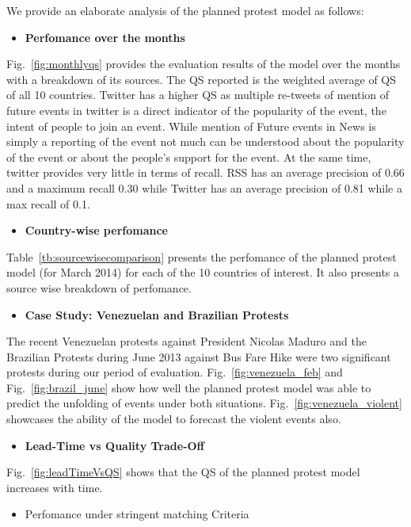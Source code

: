 We provide an elaborate analysis of the planned protest model as follows:
\begin{itemize}
    \item {\bf Perfomance over the months}
\end{itemize}
    Fig.~\ref{fig:monthlyqs} provides the evaluation results of the model over the months with a breakdown of its sources. The QS reported is the weighted average of QS of all 10 countries.
    Twitter has a higher QS as multiple re-tweets of mention of future events in twitter is a direct indicator of the popularity of the event, the intent of people to join an event. While mention of Future events in News is simply a reporting of the event not much can be understood about the popularity of the event or about the people's support for the event. At the same time, twitter provides very little in terms of recall.
RSS has an average precision of 0.66 and a maximum recall 0.30 while
Twitter has an average precision of 0.81 while a max recall of 0.1.

\begin{itemize}
    \item {\bf Country-wise perfomance}
\end{itemize}
    Table~\ref{tb:sourcewisecomparison} presents the perfomance of the planned protest model (for March 2014) for each of the 10 countries of interest. It also presents a source wise breakdown of perfomance. 


\begin{itemize}
    \item {\bf Case Study: Venezuelan and Brazilian Protests}
\end{itemize}
The recent Venezuelan protests against President Nicolas Maduro and the Brazilian Protests during June 2013 against Bus Fare Hike were two significant protests during our period of evaluation. Fig.~\ref{fig:venezuela_feb} and Fig.~\ref{fig:brazil_june} show how well the planned protest model was able to predict the unfolding of events under both situations. Fig.~\ref{fig:venezuela_violent} showcases the ability of the model to forecast the violent events also.

\begin{itemize}
    \item {\bf Lead-Time vs Quality Trade-Off}
\end{itemize}

Fig.~\ref{fig:leadTimeVsQS} shows that the QS of the planned protest model increases with time.

\begin{itemize}
    \item {Perfomance under stringent matching Criteria}
\end{itemize}

